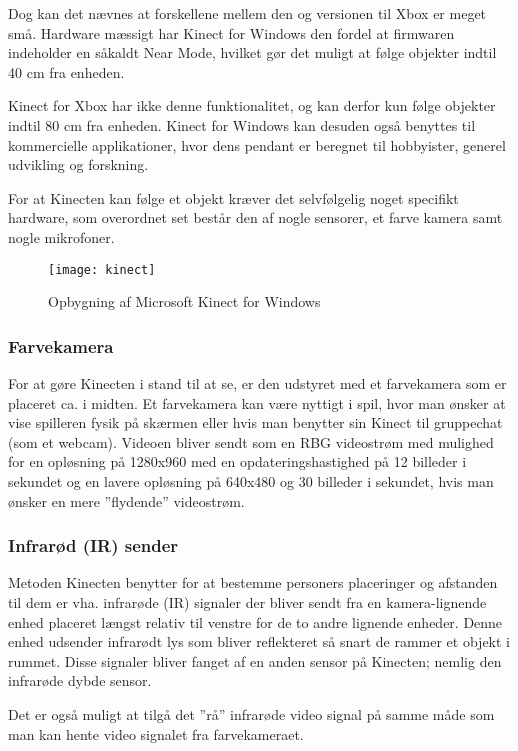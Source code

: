 Dog kan det nævnes at forskellene mellem den og versionen til Xbox er meget små.
Hardware mæssigt har Kinect for Windows den fordel at firmwaren indeholder en såkaldt Near Mode, hvilket gør det muligt at følge objekter indtil 40 cm fra enheden.

Kinect for Xbox har ikke denne funktionalitet, og kan derfor kun følge objekter indtil 80 cm fra enheden.
Kinect for Windows kan desuden også benyttes til kommercielle applikationer, hvor dens pendant er beregnet til hobbyister, generel udvikling og forskning\cite[s.~16]{kinectProgrammingGuide}.

For at Kinecten kan følge et objekt kræver det selvfølgelig noget specifikt hardware, som overordnet set består den af nogle sensorer, et farve kamera samt nogle mikrofoner.

\begin{figure}
\centering
\texttt{[image: kinect]}
\caption{Opbygning af Microsoft Kinect for Windows}
\label{kinect:opbygning}
\end{figure}

\subsubsection{Farvekamera}
For at gøre Kinecten i stand til at se, er den udstyret med et farvekamera som er placeret ca. i midten.
Et farvekamera kan være nyttigt i spil, hvor man ønsker at vise spilleren fysik på skærmen eller hvis man benytter sin Kinect til gruppechat (som et webcam).
Videoen bliver sendt som en RBG videostrøm med mulighed for en opløsning på 1280x960 med en opdateringshastighed på 12 billeder i sekundet og en lavere opløsning på 640x480 og 30 billeder i sekundet, hvis man ønsker en mere ”flydende” videostrøm\cite{kinectForWindowsFeatures}.

\subsubsection{Infrarød (IR) sender}
Metoden Kinecten benytter for at bestemme personers placeringer og afstanden til dem er vha. infrarøde (IR) signaler der bliver sendt fra en kamera-lignende enhed placeret længst relativ til venstre for de to andre lignende enheder.
Denne enhed udsender infrarødt lys som bliver reflekteret så snart de rammer et objekt i rummet. 
Disse signaler bliver fanget af en anden sensor på Kinecten; nemlig den infrarøde dybde sensor.

Det er også muligt at tilgå det ”rå” infrarøde video signal på samme måde som man kan hente video signalet fra farvekameraet.

